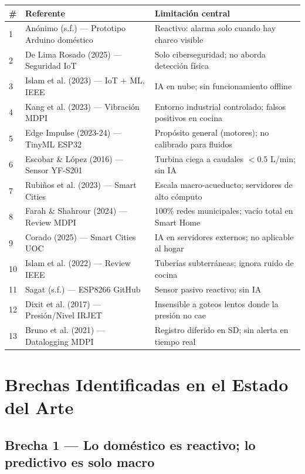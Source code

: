 \documentclass[11pt,a4paper]{article}
\begin{document}
\vspace{4pt}
\begin{tabularx}{\linewidth}{@{} >{\small}l >{\small}X >{\small}X @{}}
\toprule
\textbf{\#} & \textbf{Referente} & \textbf{Limitación central} \\
\midrule
1 & Anónimo (s.f.) — Prototipo Arduino doméstico & Reactivo: alarma solo cuando hay charco visible \\
2 & De Lima Rosado (2025) — Seguridad IoT & Solo ciberseguridad; no aborda detección física \\
3 & Islam et al. (2023) — IoT + ML, IEEE & IA en nube; sin funcionamiento offline \\
4 & Kang et al. (2023) — Vibración MDPI & Entorno industrial controlado; falsos positivos en cocina \\
5 & Edge Impulse (2023-24) — TinyML ESP32 & Propósito general (motores); no calibrado para fluidos \\
6 & Escobar \& López (2016) — Sensor YF-S201 & Turbina ciega a caudales $<$0.5 L/min; sin IA \\
7 & Rubiños et al. (2023) — Smart Cities & Escala macro-acueducto; servidores de alto cómputo \\
8 & Farah \& Shahrour (2024) — Review MDPI & 100\% redes municipales; vacío total en Smart Home \\
9 & Corado (2025) — Smart Cities UOC & IA en servidores externos; no aplicable al hogar \\
10 & Islam et al. (2022) — Review IEEE & Tuberías subterráneas; ignora ruido de cocina \\
11 & Sagat (s.f.) — ESP8266 GitHub & Sensor pasivo reactivo; sin IA \\
12 & Dixit et al. (2017) — Presión/Nivel IRJET & Insensible a goteos lentos donde la presión no cae \\
13 & Bruno et al. (2021) — Datalogging MDPI & Registro diferido en SD; sin alerta en tiempo real \\
\bottomrule
\end{tabularx}

\section{Brechas Identificadas en el Estado del Arte}

\subsection{Brecha 1 — Lo doméstico es reactivo; lo predictivo es solo macro}
\end{document}
